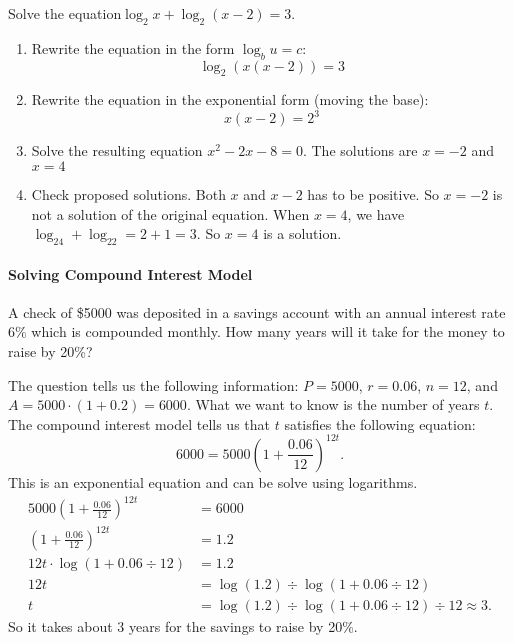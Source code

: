	\begin{example}
		Solve the equation\quad $\log_2 x + \log_2 (x - 2) = 3$.
	\end{example}
	\begin{solution}\mbox{}
		\begin{enumerate}[label={\textbf{\textup{Step \arabic*.}}~}]
			\item Rewrite the equation in the form $\log_bu=c$:
			      \[\log_2(x(x - 2)) = 3\]
			\item Rewrite the equation in the exponential form (moving the base):
			      \[x(x-2)=2^3\]
			\item Solve the resulting equation $x^2-2x-8=0$. The solutions are $x=-2$ and $x=4$
			\item Check proposed solutions. Both $x$ and $x-2$ has to be positive. So $x=-2$ is not a solution of the original equation.  When $x=4$, we have $\log_24+\log_22=2+1=3$.  So $x=4$ is a solution.
		\end{enumerate}
	\end{solution}

\paragraph*{Solving Compound Interest Model}\mbox{}

	\begin{example}
		A check of \$5000 was deposited in a savings account with an annual interest rate $6\%$ which is compounded monthly. How many years will it take for the money to raise by 20\%?
	\end{example}
	\begin{solution}
		The question tells us the following information:
		$P=5000$, $r=0.06$, $n=12$, and $A=5000\cdot (1+0.2)=6000$. What we want to know is the number of years $t$. The compound interest model tells us that $t$ satisfies the following equation:
		\[
			6000=5000\left(1+\frac{0.06}{12}\right)^{12t}.
		\]
		This is an exponential equation and can be solve using logarithms.
		\[
			\begin{split}
				5000\left(1+\frac{0.06}{12}\right)^{12t}&=6000\\
				\left(1+\frac{0.06}{12}\right)^{12t}&=1.2\\
				12t\cdot \log\left(1+0.06\div 12\right)&=1.2\\
				12t&=\log(1.2)\div \log(1+0.06\div 12)\\
				t&=\log(1.2)\div\log(1+0.06\div 12)\div 12\approx 3.
			\end{split}
		\]
		So it takes about 3 years for the savings to raise by 20\%.
	\end{solution}

